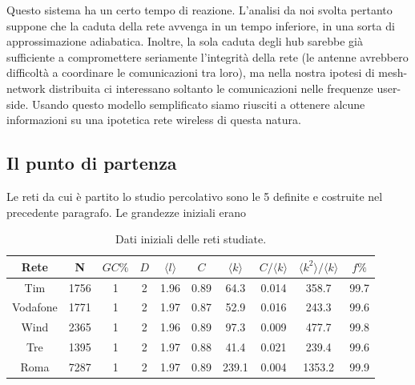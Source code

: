 Questo sistema ha un certo tempo di reazione. L'analisi da noi svolta pertanto suppone che la caduta della rete avvenga in un tempo inferiore, in una sorta di approssimazione adiabatica. Inoltre, la sola caduta degli hub sarebbe già sufficiente a compromettere seriamente l'integrità della rete (le antenne avrebbero difficoltà a coordinare le comunicazioni tra loro), ma nella nostra ipotesi di mesh-network distribuita ci interessano soltanto le comunicazioni nelle frequenze user-side. Usando questo modello semplificato siamo riusciti a ottenere alcune informazioni su una ipotetica rete wireless di questa natura.

\subsection{Il punto di partenza}
Le reti da cui è partito lo studio percolativo sono le 5 definite e costruite nel precedente paragrafo. Le grandezze iniziali erano


\begin{table}[t]
\caption{Dati iniziali delle reti studiate.}
	\begin{tabular}{cccccccccc}
	\toprule
	Rete		&N		&$GC\%$	&$D$	&$\langle l\rangle$	&$C$		&$\langle k\rangle$	&$C/\langle k\rangle$	&$\langle k^2\rangle/\langle k\rangle$	&$f\%$\\
	\midrule  
	Tim		&1756	&1		&2	&1.96			&0.89	&64.3			&0.014				&358.7							&99.7\\
	Vodafone	&1771	&1		&2	&1.97			&0.87	&52.9			&0.016				&243.3							&99.6\\
	Wind		&2365	&1		&2	&1.96			&0.89	&97.3			&0.009				&477.7							&99.8\\
	Tre		&1395	&1		&2	&1.97			&0.88	&41.4			&0.021				&239.4							&99.6\\
	Roma		&7287	&1		&2	&1.97			&0.89	&239.1			&0.004				&1353.2							&99.9\\
	\bottomrule
	\end{tabular}
\label{tab:datiInitial}
\end{table}


